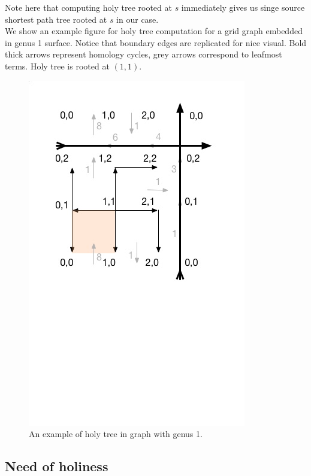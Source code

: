 \documentclass{article}
\begin{document}
Note here that computing holy tree rooted at $s$ immediately gives us singe
source shortest path tree rooted at $s$ in our case. \\

We show an example figure for holy tree computation for a grid graph 
embedded in genus 1 surface. Notice that boundary edges are replicated for nice 
visual. Bold thick arrows represent homology cycles, grey arrows correspond to 
leafmost terms. Holy tree is rooted at $(1, 1)$. 

\begin{figure}
  \label{fig: g1}
  \centering
  \includegraphics[scale = 0.5]{figures/g1.jpg}
  \vspace{-3.5cm} %
  \caption{An example of holy tree in graph with genus 1.}
\end{figure}

\subsection{Need of holiness}
\end{document}
